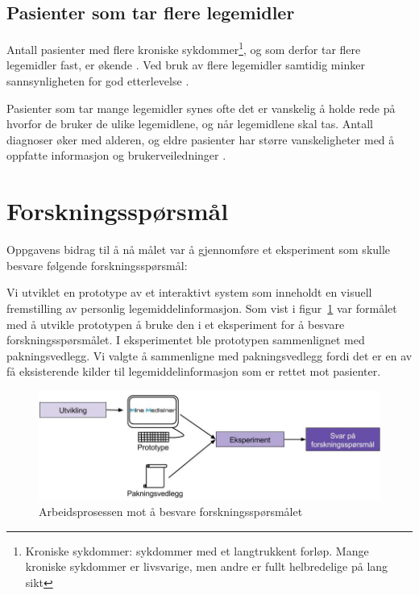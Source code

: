 \subsection*{Pasienter som tar flere legemidler}
Antall pasienter med flere kroniske sykdommer\footnote{Kroniske sykdommer: sykdommer med et langtrukkent forløp. Mange kroniske sykdommer er livsvarige, men andre er fullt helbredelige på lang sikt}, og som derfor tar flere legemidler fast, er økende \citep{MultimorbidityPrimaryCare}. Ved bruk av flere legemidler samtidig minker sannsynligheten for god etterlevelse \citep{JOCN:JOCN1477}. 

Pasienter som tar mange legemidler synes ofte det er vanskelig å holde rede på hvorfor de bruker de ulike legemidlene, og når legemidlene skal tas. Antall diagnoser øker med alderen, og eldre pasienter har større vanskeligheter med å oppfatte informasjon og brukerveiledninger \citep{ConcordanceAdherenceCompliance}. 

\section{Forskningsspørsmål} \label{sec:forskningssporsmaal}
Oppgavens bidrag til å nå målet var å gjennomføre et eksperiment som skulle besvare følgende forskningsspørsmål:
\thesisRQ 

Vi utviklet en prototype av et interaktivt system som inneholdt en visuell fremstilling av personlig legemiddelinformasjon. Som vist i figur~\ref{fig:prosess2} var formålet med å utvikle prototypen å bruke den i et eksperiment for å besvare forskningsspørsmålet. I eksperimentet ble prototypen sammenlignet med pakningsvedlegg. Vi valgte å sammenligne med pakningsvedlegg fordi det er en av få eksisterende kilder til legemiddelinformasjon som er rettet mot pasienter. 

\begin{figure}[H]
    \centering
    \includegraphics[width=\textwidth]{fig/innledning/prosess.jpg}
    \caption{Arbeidsprosessen mot å besvare forskningsspørsmålet}
    \label{fig:prosess2}
\end{figure}

